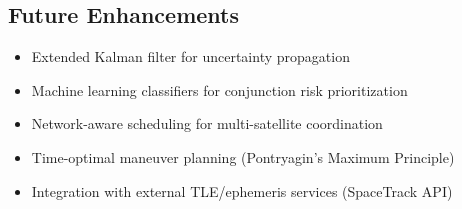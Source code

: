 \documentclass[11pt,a4paper]{article}
\begin{document}
\subsection{Future Enhancements}

\begin{itemize}
    \item Extended Kalman filter for uncertainty propagation
    \item Machine learning classifiers for conjunction risk prioritization
    \item Network-aware scheduling for multi-satellite coordination
    \item Time-optimal maneuver planning (Pontryagin's Maximum Principle)
    \item Integration with external TLE/ephemeris services (SpaceTrack API)
\end{itemize}
\end{document}

